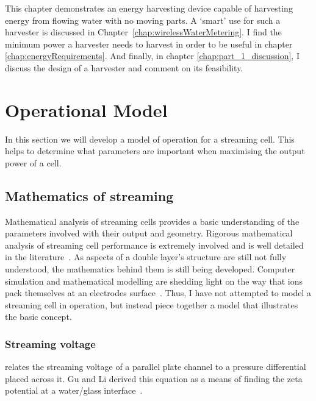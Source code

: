 
This chapter demonstrates an energy harvesting device capable of harvesting energy from flowing water with no moving parts.
A `smart' use for such a harvester is discussed in Chapter~\ref{chap:wirelessWaterMetering}.
I find the minimum power a harvester needs to harvest in order to be useful in chapter \ref{chap:energyRequirements}.
And finally, in chapter \ref{chap:part_1_discussion}, I discuss the design of a harvester and comment on its feasibility.

\section{Operational Model}

In this section we will develop a model of operation for a streaming cell.
This helps to determine what parameters are important when maximising the output power of a cell.

\subsection{Mathematics of streaming}

Mathematical analysis of streaming cells provides a basic understanding of the parameters involved with their output and geometry.
Rigorous mathematical analysis of streaming cell performance is extremely involved and is well detailed in the literature~\cite{Yang1998}.
As aspects of a double layer's structure are still not fully understood, the mathematics behind them is still being developed.
Computer simulation and mathematical modelling are shedding light on the way that ions pack themselves at an electrodes surface~\cite{Kornyshev2007}.
Thus, I have not attempted to model a streaming cell in operation, but instead piece together a model that illustrates the basic concept.

\subsubsection*{Streaming voltage}
 relates the streaming voltage of a parallel plate channel to a pressure differential placed across it.
Gu and Li derived this equation as a means of finding the zeta potential at a water/glass interface~\cite{Gu2000a}.


